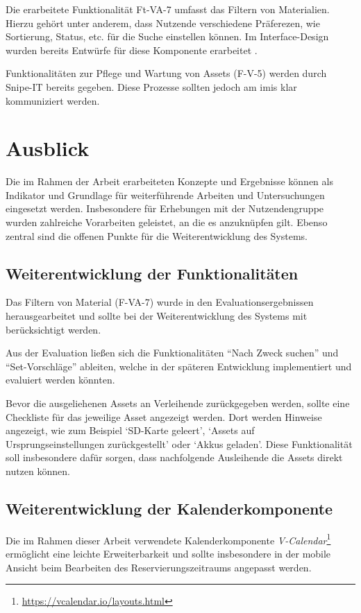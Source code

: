 Die erarbeitete Funktionalität Ft-VA-7 umfasst das Filtern von Materialien. Hierzu gehört unter
anderem, dass Nutzende verschiedene Präferezen, wie Sortierung, Status, etc. für die Suche
einstellen können. Im Interface-Design wurden bereits Entwürfe für diese Komponente erarbeitet
.

Funktionalitäten zur Pflege und Wartung von Assets (F-V-5) werden durch Snipe-IT bereits gegeben.
Diese Prozesse sollten jedoch am \ac{imis} klar kommuniziert werden.


\section{Ausblick}
Die im Rahmen der Arbeit erarbeiteten Konzepte und Ergebnisse können als Indikator und Grundlage für
weiterführende Arbeiten und Untersuchungen eingesetzt werden. Insbesondere für Erhebungen mit der
Nutzendengruppe wurden zahlreiche Vorarbeiten geleistet, an die es anzuknüpfen gilt. Ebenso zentral
sind die offenen Punkte für die Weiterentwicklung des Systems.

\subsection{Weiterentwicklung der Funktionalitäten}
Das Filtern von Material (F-VA-7) wurde in den Evaluationsergebnissen
herausgearbeitet und sollte bei der Weiterentwicklung des Systems mit
berücksichtigt werden.

Aus der Evaluation ließen sich die Funktionalitäten \enquote{Nach Zweck suchen}
und \enquote{Set-Vorschläge} ableiten, welche in der späteren Entwicklung
implementiert und evaluiert werden könnten.

Bevor die ausgeliehenen Assets an Verleihende zurückgegeben werden, sollte eine
Checkliste für das jeweilige Asset angezeigt  werden. Dort werden Hinweise angezeigt,
wie zum Beispiel \enquote*{SD-Karte geleert}, \enquote*{Assets auf Ursprungseinstellungen
zurückgestellt} oder \enquote*{Akkus geladen}. Diese Funktionalität soll insbesondere dafür
sorgen, dass nachfolgende Ausleihende die Assets direkt nutzen können.

\subsection{Weiterentwicklung der Kalenderkomponente}
Die im Rahmen dieser Arbeit verwendete Kalenderkomponente
\textit{V-Calendar}\footnote{\url{https://vcalendar.io/layouts.html}} ermöglicht
eine leichte Erweiterbarkeit und sollte insbesondere in der mobile Ansicht beim
Bearbeiten des Reservierungszeitraums angepasst werden.

